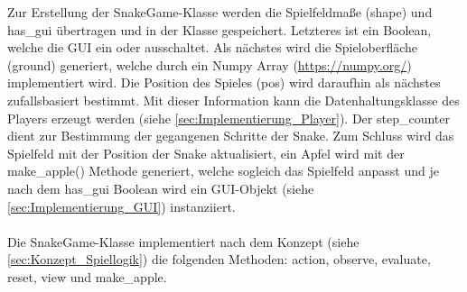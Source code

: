 Zur Erstellung der SnakeGame-Klasse werden die Spielfeldmaße (shape) und has\_gui übertragen und in der Klasse gespeichert. Letzteres ist ein Boolean, welche die GUI ein oder ausschaltet. Als nächstes wird die Spieloberfläche (ground) generiert, welche durch ein Numpy Array (\url{https://numpy.org/}) implementiert wird. Die Position des Spieles (pos) wird daraufhin als nächstes zufallsbasiert bestimmt. Mit dieser Information kann die Datenhaltungsklasse des Players erzeugt werden (siehe \ref{sec:Implementierung_Player}). Der step\_counter dient zur Bestimmung der gegangenen Schritte der Snake. Zum Schluss wird das Spielfeld mit der Position der Snake aktualisiert, ein Apfel wird mit der make\_apple() Methode generiert, welche sogleich das Spielfeld anpasst und je nach dem has\_gui Boolean wird ein GUI-Objekt (siehe \ref{sec:Implementierung_GUI}) instanziiert.\\
\\Die SnakeGame-Klasse implementiert nach dem Konzept (siehe \ref{sec:Konzept_Spiellogik}) die folgenden Methoden: action, observe, evaluate, reset, view und make\_apple.


